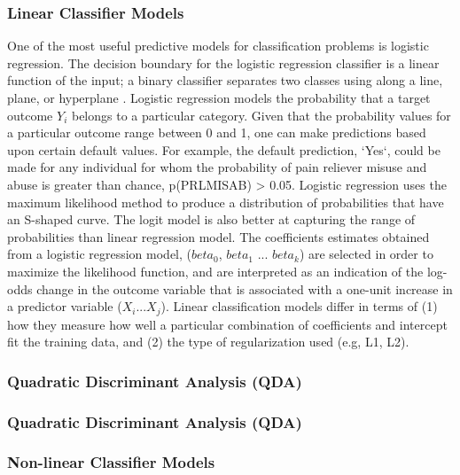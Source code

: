 \documentclass[sigconf]{acmart}
\begin{document}
\subsubsection{Linear Classifier Models}

One of the most useful predictive models for classification problems is 
logistic regression. The decision boundary for the logistic regression 
classifier is a linear function of the input; a binary classifier separates 
two classes using along a line, plane, or hyperplane \cite{muller17}.
Logistic regression models the probability that a target outcome \emph{$Y_i$} 
belongs to a particular category. Given that the probability values for a 
particular outcome range between 0 and 1, one can make predictions based 
upon certain default values. For example, the default prediction, `Yes`, 
could be made for any individual for whom the probability of pain reliever
misuse and abuse is greater than chance, p(PRLMISAB) > 0.05. Logistic
regression uses the maximum likelihood method to produce a distribution of
probabilities that have an S-shaped curve. The logit model is also better
at capturing the range of probabilities than linear regression model. 
The coefficients estimates obtained from a logistic regression model, 
($beta_0$, $beta_1$ ... $beta_k$) are selected in order to maximize the 
likelihood function, and are interpreted as an indication of the log-odds 
change in the outcome variable that is associated with a one-unit increase 
in a predictor variable ($X_i$...$X_j$). Linear classification models differ 
in terms of (1) how they measure how well a particular combination of 
coefficients and intercept fit the training data, and (2) the type of 
regularization used (e.g, L1, L2).

\subsubsection{Quadratic Discriminant Analysis (QDA)}

\subsubsection{Quadratic Discriminant Analysis (QDA)}




\subsubsection{Non-linear Classifier Models}
\end{document}
